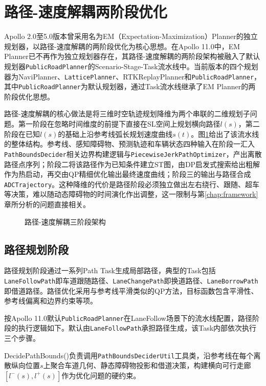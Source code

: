 \section{路径-速度解耦两阶段优化}

Apollo 2.0至5.0版本曾采用名为EM（Expectation-Maximization）Planner\cite{fan2018baidu}的独立规划器，以路径-速度解耦的两阶段优化为核心思想。在Apollo 11.0中，EM Planner已不再作为独立规划器存在，其路径-速度解耦的两阶段架构被融入了默认规划器\texttt{PublicRoadPlanner}的Scenario-Stage-Task流水线中。当前版本的四个规划器为NaviPlanner、\texttt{LatticePlanner}、RTKReplayPlanner和\texttt{PublicRoadPlanner}，其中\texttt{PublicRoadPlanner}为默认规划器，通过Task流水线继承了EM Planner的两阶段优化思想。

路径-速度解耦的核心做法是将三维时空轨迹规划降维为两个串联的二维规划子问题。第一阶段在忽略时间维度的前提下直接在SL空间上规划横向路径$l(s)$，第二阶段在已知$l(s)$的基础上沿参考线弧长规划速度曲线$s(t)$。图\ref{fig:path_speed_decouple}给出了该流水线的整体结构。参考线、感知障碍物、预测轨迹和车辆状态四种输入在阶段一汇入\texttt{PathBoundsDecider}相关边界构建逻辑与\texttt{PiecewiseJerkPathOptimizer}，产出离散路径点序列；阶段二将该路径作为已知条件建立ST图，由DP启发式搜索给出粗解作为热启动，再交由QP精细优化输出最终速度曲线；阶段三的输出与路径合成\texttt{ADCTrajectory}。这种降维的代价是路径阶段必须独立做出左右绕行、跟随、超车等决策，难以随动态障碍物的时间演化作出调整，这一限制与第\ref{chap:framework}章所分析的问题直接相关。

\begin{figure}[htbp]
\centering
{}
\caption{路径-速度解耦三阶段架构}
\label{fig:path_speed_decouple}
\end{figure}

\subsection{路径规划阶段}

路径规划阶段通过一系列Path Task生成局部路径，典型的Task包括\texttt{LaneFollowPath}即车道跟随路径、\texttt{LaneChangePath}即换道路径、\texttt{LaneBorrowPath}即借道路径。路径优化采用与参考线平滑类似的QP方法，目标函数包含平滑性、参考线偏离和边界约束等项。

按Apollo 11.0默认\texttt{PublicRoadPlanner}在LaneFollow场景下的流水线配置，路径阶段的执行逻辑如下。默认由\texttt{LaneFollowPath}承担路径生成，该Task内部依次执行三个步骤。

DecidePathBounds()负责调用\texttt{PathBoundsDeciderUtil}工具类，沿参考线在每个离散纵向位置$s$上聚合车道几何、静态障碍物投影和借道决策，构建横向可行走廊$[l^-(s), l^+(s)]$作为优化问题的硬约束。

